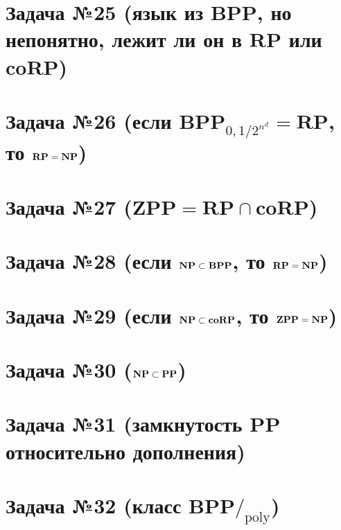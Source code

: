 \section{Задача №25 (язык из $\mathbf{BPP}$, но непонятно, лежит ли он в $\mathbf{RP}$ или $\mathbf{coRP}$)}

\section{Задача №26 (если $\mathbf{BPP}_{0,1/2^{n^d}} = \mathbf{RP}$, то $\mathbf{RP} = \textbf{NP}$)}


\section{Задача №27 ($\mathbf{ZPP} = \mathbf{RP} \cap \mathbf{coRP}$)}


\section{Задача №28 (если $\textbf{NP} \subset \mathbf{BPP}$, то $\mathbf{RP}=\textbf{NP}$)}


\section{Задача №29 (если $\textbf{NP} \subset \mathbf{coRP}$, то $\mathbf{ZPP}=\textbf{NP}$)}


\section{Задача №30 ($\textbf{NP} \subset \mathbf{PP}$)}


\section{Задача №31 (замкнутость $\mathbf{PP}$ относительно дополнения)}


\section{Задача №32 (класс $\mathbf{BPP} /_{\text{poly}}$)}


